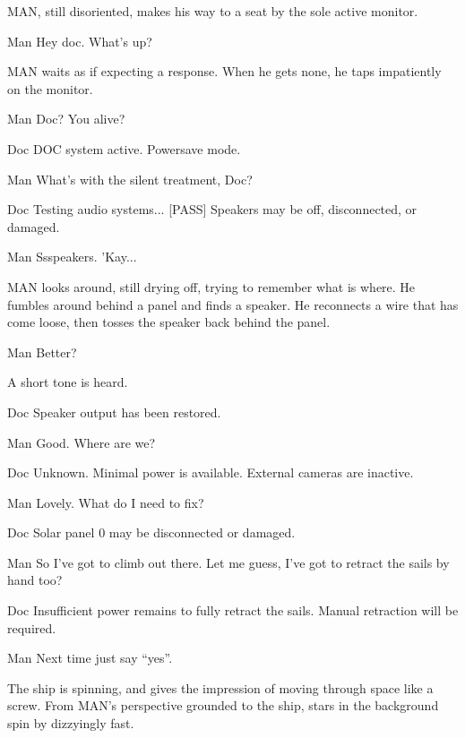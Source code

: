 \documentclass{screenplay}
\begin{document}
MAN, still disoriented, makes his way to a seat by the sole active monitor.
\begin{dialogue}{Man}
Hey doc.  What's up?
\end{dialogue}
MAN waits as if expecting a response.  When he gets none, he taps impatiently on the monitor.
\begin{dialogue}{Man}
Doc?  You alive?
\end{dialogue}
\begin{dialogue}[on-screen]{Doc}
DOC system active.
Powersave mode.
\end{dialogue}
\begin{dialogue}{Man}
What's with the silent treatment, Doc?
\end{dialogue}
\begin{dialogue}[on-screen]{Doc}
Testing audio systems... [PASS]
Speakers may be off, disconnected, or damaged.
\end{dialogue}
\begin{dialogue}{Man}
Ssspeakers.  'Kay...
\end{dialogue}
MAN looks around, still drying off, trying to remember what is where.  He fumbles around behind a panel and finds a speaker.  He reconnects a wire that has come loose, then tosses the speaker back behind the panel.
\begin{dialogue}{Man}
Better?
\end{dialogue}
A short tone is heard.
\begin{dialogue}{Doc}
Speaker output has been restored.
\end{dialogue}
\begin{dialogue}{Man}
Good.  Where are we?
\end{dialogue}
\begin{dialogue}{Doc}
Unknown.  Minimal power is available.  External cameras are inactive.
\end{dialogue}
\begin{dialogue}{Man}
Lovely.  What do I need to fix?
\end{dialogue}
\begin{dialogue}{Doc}
Solar panel 0 may be disconnected or damaged.
\end{dialogue}
\begin{dialogue}[sobering up]{Man}
So I've got to climb out there.  Let me guess, I've got to retract the sails by hand too?
\end{dialogue}
\begin{dialogue}{Doc}
Insufficient power remains to fully retract the sails.  Manual retraction will be required.
\end{dialogue}
\begin{dialogue}{Man}
Next time just say ``yes''.
\end{dialogue}
The ship is spinning, and gives the impression of moving through space like a screw.  From MAN's perspective grounded to the ship, stars in the background spin by dizzyingly fast.
\end{document}
